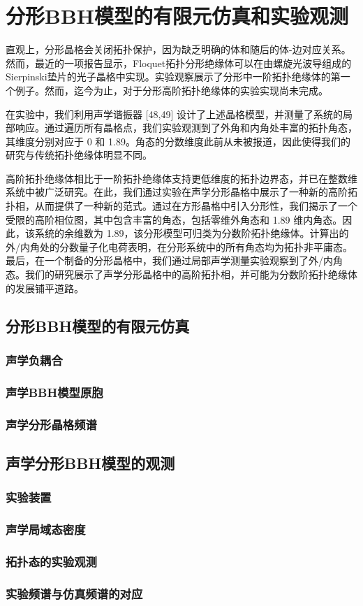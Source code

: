 \chapter{分形BBH模型的有限元仿真和实验观测}
直观上，分形晶格会关闭拓扑保护\cite{liu2021sierpinski}，因为缺乏明确的体和随后的体-边对应关系。然而，最近的一项报告显示，Floquet拓扑分形绝缘体可以在由螺旋光波导组成的Sierpinski垫片的光子晶格中实现\cite{yang2020photonic}。实验观察\cite{biesenthal2022fractal}展示了分形中一阶拓扑绝缘体的第一个例子。然而，迄今为止，对于分形高阶拓扑绝缘体的实验实现尚未完成。

在实验中，我们利用声学谐振器 [48,49] 设计了上述晶格模型，并测量了系统的局部响应。通过遍历所有晶格点，我们实验观测到了外角和内角处丰富的拓扑角态，其维度分别对应于 0 和 1.89。角态的分数维度此前从未被报道，因此使得我们的研究与传统拓扑绝缘体明显不同。

高阶拓扑绝缘体相比于一阶拓扑绝缘体支持更低维度的拓扑边界态，并已在整数维系统中被广泛研究。在此，我们通过实验在声学分形晶格中展示了一种新的高阶拓扑相，从而提供了一种新的范式。通过在方形晶格中引入分形性，我们揭示了一个受限的高阶相位图，其中包含丰富的角态，包括零维外角态和 1.89 维内角态。因此，该系统的余维数为 1.89，该分形模型可归类为分数阶拓扑绝缘体。计算出的外/内角处的分数量子化电荷表明，在分形系统中的所有角态均为拓扑非平庸态。最后，在一个制备的分形晶格中，我们通过局部声学测量实验观察到了外/内角态。我们的研究展示了声学分形晶格中的高阶拓扑相，并可能为分数阶拓扑绝缘体的发展铺平道路。

\section{分形BBH模型的有限元仿真}
\subsection{声学负耦合}
\subsection{声学BBH模型原胞}
\subsection{声学分形晶格频谱}

\section{声学分形BBH模型的观测}
\subsection{实验装置}
\subsection{声学局域态密度}
\subsection{拓扑态的实验观测}
\subsection{实验频谱与仿真频谱的对应}
